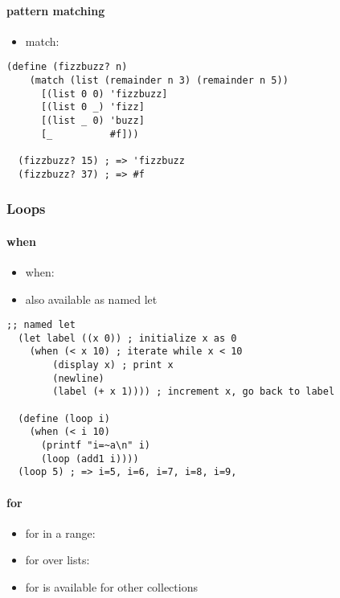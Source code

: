 \documentclass[a4paper,landscape,10pt]{article}
\begin{document}
\begin{multicols*}{2}
  \paragraph{pattern matching}

  \begin{itemize}
    \item match: 
  \end{itemize}

  \begin{lstlisting}[language=Racket]
    (define (fizzbuzz? n)
    (match (list (remainder n 3) (remainder n 5))
      [(list 0 0) 'fizzbuzz]
      [(list 0 _) 'fizz]
      [(list _ 0) 'buzz]
      [_          #f]))

  (fizzbuzz? 15) ; => 'fizzbuzz
  (fizzbuzz? 37) ; => #f
  \end{lstlisting}

  \subsubsection{Loops}

  \paragraph{when}

  \begin{itemize}
    \item when: 
    \item also available as named let
  \end{itemize}

  \begin{lstlisting}[language=Racket]
  ;; named let
  (let label ((x 0)) ; initialize x as 0
	(when (< x 10) ; iterate while x < 10
		(display x) ; print x
		(newline)
		(label (+ x 1)))) ; increment x, go back to label

  (define (loop i)
    (when (< i 10)
      (printf "i=~a\n" i)
      (loop (add1 i))))
  (loop 5) ; => i=5, i=6, i=7, i=8, i=9,
  \end{lstlisting}

  \paragraph{for}

  \begin{itemize}
    \item for in a range: 
    \item for over lists: 
    \item for is available for other collections
  \end{itemize}


\end{multicols*}
\end{document}
